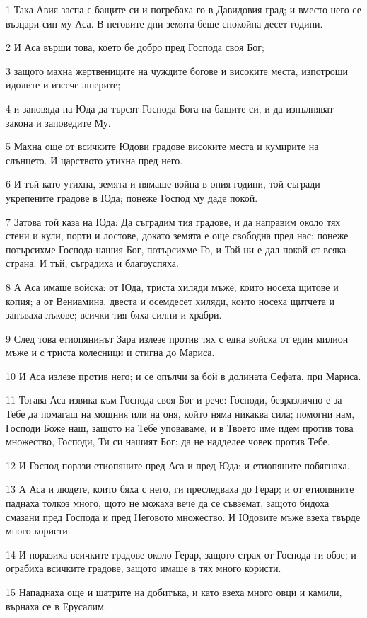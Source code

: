 \par 1 Така Авия заспа с бащите си и погребаха го в Давидовия град; и вместо него се възцари син му Аса. В неговите дни земята беше спокойна десет години.
\par 2 И Аса върши това, което бе добро пред Господа своя Бог;
\par 3 защото махна жертвениците на чуждите богове и високите места, изпотроши идолите и изсече ашерите;
\par 4 и заповяда на Юда да търсят Господа Бога на бащите си, и да изпълняват закона и заповедите Му.
\par 5 Махна още от всичките Юдови градове високите места и кумирите на слънцето. И царството утихна пред него.
\par 6 И тъй като утихна, земята и нямаше война в ония години, той съгради укрепените градове в Юда; понеже Господ му даде покой.
\par 7 Затова той каза на Юда: Да съградим тия градове, и да направим около тях стени и кули, порти и лостове, докато земята е още свободна пред нас; понеже потърсихме Господа нашия Бог, потърсихме Го, и Той ни е дал покой от всяка страна. И тъй, съградиха и благоуспяха.
\par 8 А Аса имаше войска: от Юда, триста хиляди мъже, които носеха щитове и копия; а от Вениамина, двеста и осемдесет хиляди, които носеха щитчета и запъваха лъкове; всички тия бяха силни и храбри.
\par 9 След това етиопянинът Зара излезе против тях с една войска от един милион мъже и с триста колесници и стигна до Мариса.
\par 10 И Аса излезе против него; и се опълчи за бой в долината Сефата, при Мариса.
\par 11 Тогава Аса извика към Господа своя Бог и рече: Господи, безразлично е за Тебе да помагаш на мощния или на оня, който няма никаква сила; помогни нам, Господи Боже наш, защото на Тебе уповаваме, и в Твоето име идем против това множество, Господи, Ти си нашият Бог; да не надделее човек против Тебе.
\par 12 И Господ порази етиопяните пред Аса и пред Юда; и етиопяните побягнаха.
\par 13 А Аса и людете, които бяха с него, ги преследваха до Герар; и от етиопяните паднаха толкоз много, щото не можаха вече да се съвземат, защото бидоха смазани пред Господа и пред Неговото множество. И Юдовите мъже взеха твърде много користи.
\par 14 И поразиха всичките градове около Герар, защото страх от Господа ги обзе; и ограбиха всичките градове, защото имаше в тях много користи.
\par 15 Нападнаха още и шатрите на добитъка, и като взеха много овци и камили, върнаха се в Ерусалим.

